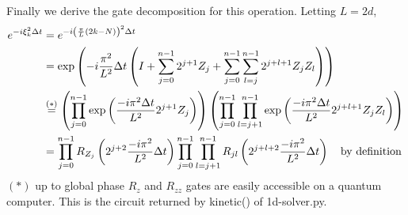\documentclass[10pt]{article}
\begin{document}
Finally we derive the gate decomposition for this operation. Letting $L = 2d$,
\begin{align*}
    e^{-i \xi_k^2 \Delta t} &= e^{-i \left(\frac{\pi}{L}(2k-N)\right)^2 \Delta t} \\
                            &= \exp\left(-i \frac{\pi^2}{L^2} \Delta t\left(I + \sum_{j=0}^{n-1} 2^{j+1} Z_j + \sum_{j=0}^{n-1} \sum_{l=j}^{n-1} 2^{j+l+1} Z_j Z_l\right)\right) \\
                            &\stackrel{(*)}{=} \left(\prod_{j=0}^{n-1} \exp\left( \frac{-i \pi^2 \Delta t}{L^2} 2^{j+1} Z_j \right)\right) \left( \prod_{j=0}^{n-1} \prod_{l=j+1}^{n-1} \exp\left(
                            \frac{-i \pi^2 \Delta t}{L^2} 2^{j+l+1} Z_j Z_l \right)\right) \\
                            &= \prod_{j=0}^{n-1} R_{Z_j}\left(2^{j+2} \frac{-i \pi^2}{L^2} \Delta t\right) \prod_{j=0}^{n-1} \prod_{l=j+1}^{n-1} R_{jl}\left(2^{j+l+2} \frac{-i \pi^2}{L^2} \Delta t\right) 
                            \text{\quad by definition}
\end{align*}
$(*)$ up to global phase \newline
$R_z$ and $R_{zz}$ gates are easily accessible on a quantum computer. This is the
circuit returned by kinetic() of 1d-solver.py.
\end{document}
